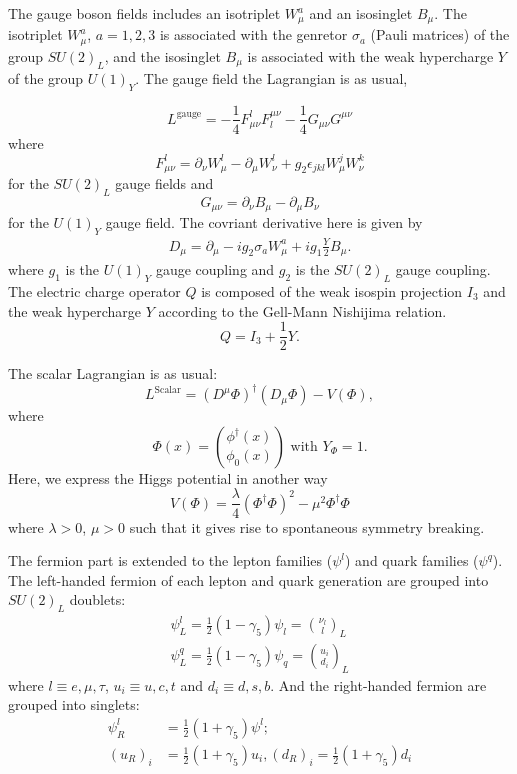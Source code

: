 The gauge boson fields includes an isotriplet $W^a_\mu$ and an isosinglet $B_\mu$.  The isotriplet $W^a_\mu$, $a=1,2,3$ is associated with the genretor $\sigma_a$ (Pauli matrices) of the group $SU(2)_L$, and the isosinglet $B_\mu$ is associated with the weak hypercharge $Y$ of the group $U(1)_Y$. The gauge field the Lagrangian is as usual,

\begin{equation}
L^{\text{gauge}}=-\frac{1}{4}F^l_{\mu\nu}F_l^{\mu\nu}-\frac{1}{4}G_{\mu\nu}G^{\mu\nu}
\end{equation}
where 
\begin{equation}
F^l_{\mu\nu}=\partial_\nu W^l_\mu-\partial_\mu W^l_\nu+g_2\epsilon_{jkl} W^j_{\mu} W^k_{\nu}
\end{equation}
for the $SU(2)_L$ gauge fields and
\begin{equation}
G_{\mu\nu}=\partial_\nu B_\mu -\partial_\mu B_\nu
\end{equation}
for the $U(1)_Y$ gauge field. The covriant derivative here is given by
\begin{eqnarray}
D_\mu=\partial_\mu -ig_2\sigma_aW^a_\mu+ig_1\frac{Y}{2}B_\mu.
\end{eqnarray} where $g_1$ is the $U(1)_Y$ gauge coupling and $g_2$ is the $SU(2)_L$ gauge coupling.
The electric charge operator $Q$ is composed of the weak isospin projection $I_3$ and the weak hypercharge $Y$ according to the Gell-Mann Nishijima relation.
\begin{equation}
Q=I_3+\frac{1}{2}Y.
\end{equation}

The scalar Lagrangian is as usual:
\begin{equation}
L^\text{Scalar} = (D^\mu \Phi)^\dagger(D_\mu \Phi)-V(\Phi),
\end{equation} 
where
\begin{equation}
\Phi(x)=\binom{\phi^\dagger(x)}{\phi_0(x)} \text{ with } Y_{\Phi}=1.
\end{equation}
Here, we express the Higgs potential in another way
\begin{equation}
V(\Phi)=\frac{\lambda}{4}(\Phi^\dagger\Phi)^2-\mu^2\Phi^\dagger\Phi
\end{equation}
where $\lambda>0$, $\mu>0$ such that it gives rise to spontaneous symmetry breaking.

The fermion part is extended to the lepton families ($\psi^{l}$) and quark families ($\psi^{q}$). The left-handed fermion of each lepton and quark generation are grouped into $SU(2)_L$ doublets:
\begin{align}
\psi^l_L=\frac{1}{2}(1-\gamma_5)\psi_l=\binom{\nu_l}{l}_L\nonumber\\
\psi^q_L=\frac{1}{2}(1-\gamma_5)\psi_q=\binom{u_i}{d_i}_L
\end{align}
where $l\equiv e, \mu, \tau$, $u_i\equiv u,c,t$ and $d_i\equiv d,s,b$. And the right-handed fermion are grouped into singlets:
\begin{align}
\psi^l_R&=\frac{1}{2}(1+\gamma_5)\psi^l;\nonumber\\ (u_{R})_i&=\frac{1}{2}(1+\gamma_5)u_i, (d_{R})_i=\frac{1}{2}(1+\gamma_5)d_i
\end{align}

